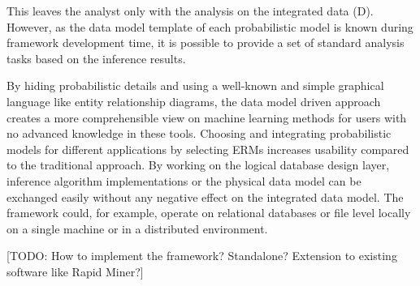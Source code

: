 This leaves the analyst only with the analysis on the integrated data (D). However, as the data model template of each probabilistic model is known during framework development time, it is possible to provide a set of standard analysis tasks based on the inference results.

By hiding probabilistic details and using a well-known and simple graphical language like entity relationship diagrams, the data model driven approach creates a more comprehensible view on machine learning methods for users with no advanced knowledge in these tools. Choosing and integrating probabilistic models for different applications by selecting ERMs increases usability compared to the traditional approach. By working on the logical database design layer, inference algorithm implementations or the physical data model can be exchanged easily without any negative effect on the integrated data model. The framework could, for example, operate on relational databases or file level locally on a single machine or in a distributed environment.

[TODO: How to implement the framework? Standalone? Extension to existing software like Rapid Miner?]
